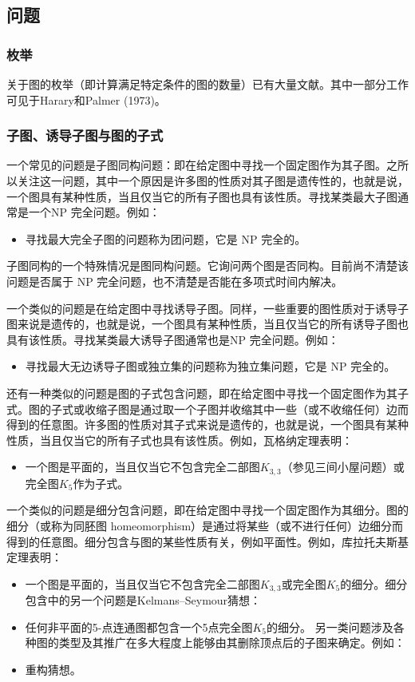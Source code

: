 \subsection{问题}
\subsubsection{枚举}
关于图的枚举（即计算满足特定条件的图的数量）已有大量文献。其中一部分工作可见于Harary和Palmer (1973)。
\subsubsection{子图、诱导子图与图的子式}
一个常见的问题是子图同构问题：即在给定图中寻找一个固定图作为其子图。之所以关注这一问题，其中一个原因是许多图的性质对其子图是遗传性的，也就是说，一个图具有某种性质，当且仅当它的所有子图也具有该性质。寻找某类最大子图通常是一个NP 完全问题。例如：
\begin{itemize}
\item 寻找最大完全子图的问题称为团问题，它是 NP 完全的。
\end{itemize}
子图同构的一个特殊情况是图同构问题。它询问两个图是否同构。目前尚不清楚该问题是否属于 NP 完全问题，也不清楚是否能在多项式时间内解决。

一个类似的问题是在给定图中寻找诱导子图。同样，一些重要的图性质对于诱导子图来说是遗传的，也就是说，一个图具有某种性质，当且仅当它的所有诱导子图也具有该性质。寻找某类最大诱导子图通常也是NP 完全问题。例如：
\begin{itemize}
\item 寻找最大无边诱导子图或独立集的问题称为独立集问题，它是 NP 完全的。
\end{itemize}
还有一种类似的问题是图的子式包含问题，即在给定图中寻找一个固定图作为其子式。图的子式或收缩子图是通过取一个子图并收缩其中一些（或不收缩任何）边而得到的任意图。许多图的性质对其子式来说是遗传的，也就是说，一个图具有某种性质，当且仅当它的所有子式也具有该性质。例如，瓦格纳定理表明：
\begin{itemize}
\item 一个图是平面的，当且仅当它不包含完全二部图$K_{3,3}$（参见三间小屋问题）或完全图$K_{5}$作为子式。
\end{itemize}
一个类似的问题是细分包含问题，即在给定图中寻找一个固定图作为其细分。图的细分（或称为同胚图 homeomorphism）是通过将某些（或不进行任何）边细分而得到的任意图。细分包含与图的某些性质有关，例如平面性。例如，库拉托夫斯基定理表明：
\begin{itemize}
\item 一个图是平面的，当且仅当它不包含完全二部图$K_{3,3}$或完全图$K_{5}$的细分。细分包含中的另一个问题是Kelmans–Seymour猜想：
\item 任何非平面的5-点连通图都包含一个5点完全图$K_{5}$的细分。
另一类问题涉及各种图的类型及其推广在多大程度上能够由其删除顶点后的子图来确定。例如：
\item 重构猜想。
\end{itemize}
